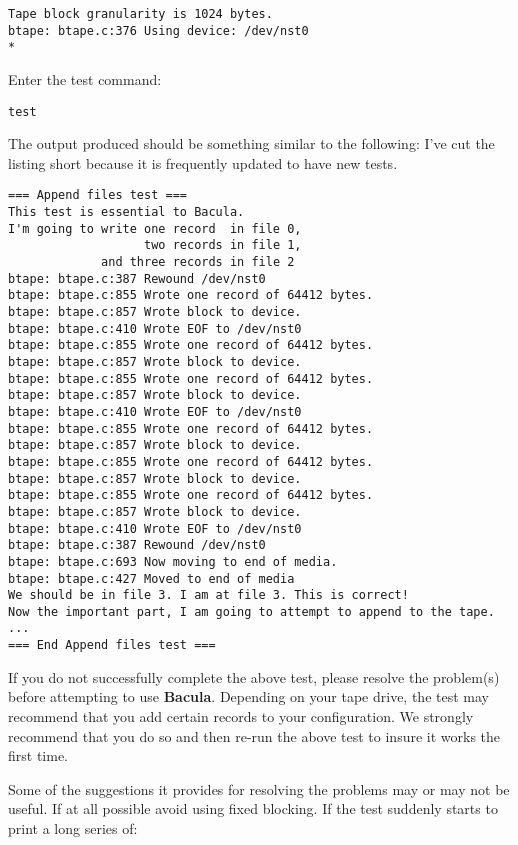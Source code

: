\footnotesize
\begin{verbatim}
Tape block granularity is 1024 bytes.
btape: btape.c:376 Using device: /dev/nst0
*
\end{verbatim}
\normalsize

Enter the test command:

\footnotesize
\begin{verbatim}
test
\end{verbatim}
\normalsize

The output produced should be something similar to the following: I've cut the
listing short because it is frequently updated to have new tests.

\footnotesize
\begin{verbatim}
=== Append files test ===
This test is essential to Bacula.
I'm going to write one record  in file 0,
                   two records in file 1,
             and three records in file 2
btape: btape.c:387 Rewound /dev/nst0
btape: btape.c:855 Wrote one record of 64412 bytes.
btape: btape.c:857 Wrote block to device.
btape: btape.c:410 Wrote EOF to /dev/nst0
btape: btape.c:855 Wrote one record of 64412 bytes.
btape: btape.c:857 Wrote block to device.
btape: btape.c:855 Wrote one record of 64412 bytes.
btape: btape.c:857 Wrote block to device.
btape: btape.c:410 Wrote EOF to /dev/nst0
btape: btape.c:855 Wrote one record of 64412 bytes.
btape: btape.c:857 Wrote block to device.
btape: btape.c:855 Wrote one record of 64412 bytes.
btape: btape.c:857 Wrote block to device.
btape: btape.c:855 Wrote one record of 64412 bytes.
btape: btape.c:857 Wrote block to device.
btape: btape.c:410 Wrote EOF to /dev/nst0
btape: btape.c:387 Rewound /dev/nst0
btape: btape.c:693 Now moving to end of media.
btape: btape.c:427 Moved to end of media
We should be in file 3. I am at file 3. This is correct!
Now the important part, I am going to attempt to append to the tape.
...
=== End Append files test ===
\end{verbatim}
\normalsize

If you do not successfully complete the above test, please resolve the
problem(s) before attempting to use {\bf Bacula}. Depending on your tape
drive, the test may recommend that you add certain records to your
configuration. We strongly recommend that you do so and then re-run the above
test to insure it works the first time.

Some of the suggestions it provides for resolving the problems may or may not
be useful. If at all possible avoid using fixed blocking. If the test suddenly
starts to print a long series of:

